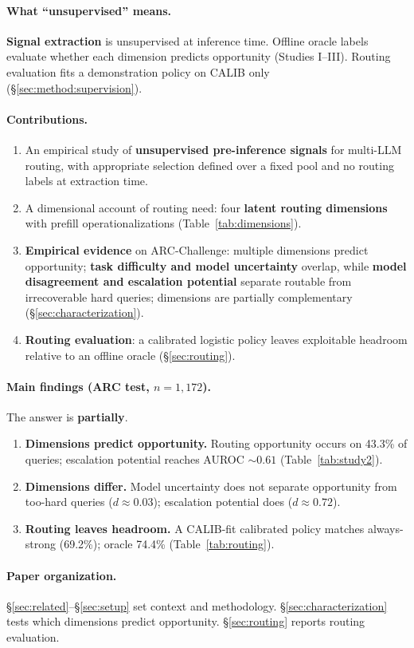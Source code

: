 \paragraph{What ``unsupervised'' means.}
\textbf{Signal extraction} is unsupervised at inference time.
Offline oracle labels evaluate whether each dimension predicts opportunity (Studies I--III).
Routing evaluation fits a demonstration policy on CALIB only (\S\ref{sec:method:supervision}).

\paragraph{Contributions.}
\begin{enumerate}
  \item An empirical study of \textbf{unsupervised pre-inference signals} for multi-LLM routing, with appropriate selection defined over a fixed pool and no routing labels at extraction time.
  \item A dimensional account of routing need: four \textbf{latent routing dimensions} with prefill operationalizations (Table~\ref{tab:dimensions}).
  \item \textbf{Empirical evidence} on ARC-Challenge: multiple dimensions predict opportunity; \textbf{task difficulty and model uncertainty} overlap, while \textbf{model disagreement and escalation potential} separate routable from irrecoverable hard queries; dimensions are partially complementary (\S\ref{sec:characterization}).
  \item \textbf{Routing evaluation}: a calibrated logistic policy leaves exploitable headroom relative to an offline oracle (\S\ref{sec:routing}).
\end{enumerate}

\paragraph{Main findings (ARC test, $n{=}1{,}172$).}
The answer is \textbf{partially}.
\begin{enumerate}
  \item \textbf{Dimensions predict opportunity.} Routing opportunity occurs on 43.3\% of queries; escalation potential reaches AUROC ${\sim}0.61$ (Table~\ref{tab:study2}).
  \item \textbf{Dimensions differ.} Model uncertainty does not separate opportunity from too-hard queries ($d{\approx}0.03$); escalation potential does ($d{\approx}0.72$).
  \item \textbf{Routing leaves headroom.} A CALIB-fit calibrated policy matches always-strong (69.2\%); oracle 74.4\% (Table~\ref{tab:routing}).
\end{enumerate}

\paragraph{Paper organization.}
\S\ref{sec:related}--\S\ref{sec:setup} set context and methodology.
\S\ref{sec:characterization} tests which dimensions predict opportunity.
\S\ref{sec:routing} reports routing evaluation.
